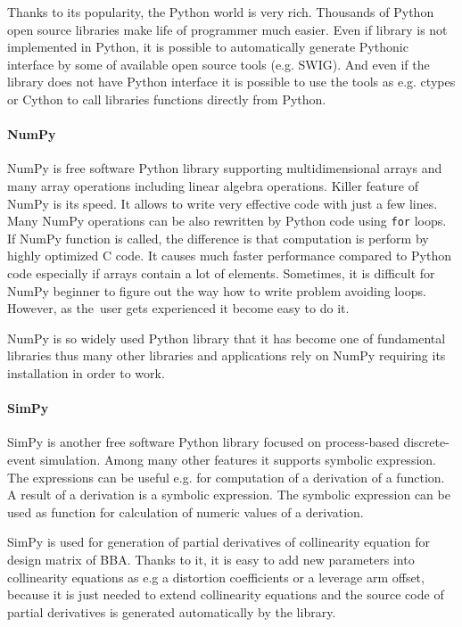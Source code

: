 \documentclass[a4paper,12pt]{article}
\begin{document}
Thanks to its popularity, the Python world is very rich. 
Thousands of Python open source libraries make life of programmer much easier. Even 
if library is not implemented in Python, it is possible to automatically generate Pythonic 
interface by some of available open source tools (e.g. SWIG). 
And even if the library does not have Python interface it 
is possible to use the tools as e.g. ctypes or Cython to call libraries functions directly from Python.

\paragraph{NumPy}

NumPy is free software Python library supporting multidimensional arrays and many array operations
including linear algebra operations. Killer feature of NumPy is its speed.
 It allows to write very effective code with just a few lines. Many  NumPy operations can be
also rewritten by Python code using  {\tt for} loops. If NumPy function is called, the difference is
 that computation is perform by highly optimized C code. It causes much faster performance compared 
to Python code especially if arrays contain 
a lot of elements. Sometimes, it is difficult for NumPy beginner to figure out the way how 
to write problem avoiding loops. However, as the~user gets experienced 
it become easy to do it. 

NumPy is so widely used Python library that it has become one of fundamental libraries thus many
other libraries and applications rely on NumPy requiring its installation in order to work.

\paragraph{SimPy}

SimPy is another free software Python library focused on process-based discrete-event simulation.
Among many other features it supports symbolic expression. The expressions can be useful
e.g. for computation of a derivation of a function. A result of a derivation is a symbolic expression.
The symbolic expression can be used as function for calculation of numeric values of a derivation. 

SimPy is used for generation of partial derivatives of collinearity equation for design matrix 
of BBA. Thanks to it,
it is easy to add new parameters into collinearity equations as e.g a distortion coefficients or a leverage arm offset,
because it is just needed to extend collinearity equations and the source code of partial derivatives 
is generated automatically by the library. 
\end{document}
